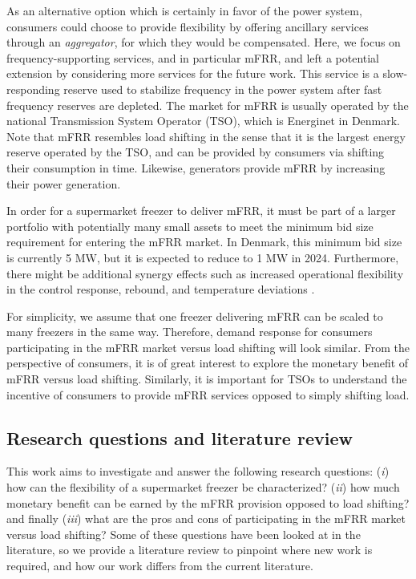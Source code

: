 As an alternative option which is certainly in favor of the power system, consumers could choose to provide flexibility by offering ancillary services through an \textit{aggregator}, for which they would be compensated. Here, we focus on frequency-supporting services, and in particular mFRR, and left a potential extension by considering more services for the future work. This service is a slow-responding reserve used to stabilize frequency in the power system after fast frequency reserves are depleted. The market for mFRR is usually operated by the national Transmission System Operator (TSO), which is Energinet in Denmark. Note that mFRR resembles load shifting in the sense that it is the largest energy reserve operated by the TSO, and can be provided by consumers via shifting their consumption in time. Likewise, generators provide mFRR by increasing their power generation.

In order for a supermarket freezer to deliver mFRR, it must be part of a larger portfolio with potentially many small assets to meet the minimum bid size requirement for entering the mFRR market. In Denmark, this minimum bid size is currently 5 MW, but it is expected to reduce to 1 MW in 2024. Furthermore, there might be additional synergy effects such as increased operational flexibility in the control response, rebound, and temperature deviations \cite{koch2011modeling}. 

For simplicity, we assume that one freezer delivering mFRR can be scaled to many freezers in the same way. Therefore, 
demand response for consumers participating in the mFRR market versus load shifting will  look similar. From the perspective of consumers, it is of great interest to explore the monetary benefit of mFRR versus load shifting. Similarly, it is important for TSOs to understand the incentive of consumers to provide mFRR services opposed to simply shifting load.

\vspace{-1mm}
\subsection{Research questions and literature review}
%
This work aims to investigate and answer the following research questions: (\textit{i}) how can the flexibility of a supermarket freezer be characterized? (\textit{ii}) how much monetary benefit can be earned by the mFRR provision opposed to load shifting? and finally (\textit{iii})
what are the pros and cons of participating in the mFRR market versus load shifting? Some of these questions have been  looked at  in the literature, so we provide a  literature review to pinpoint where new work is required, and how our work differs from the current literature.



